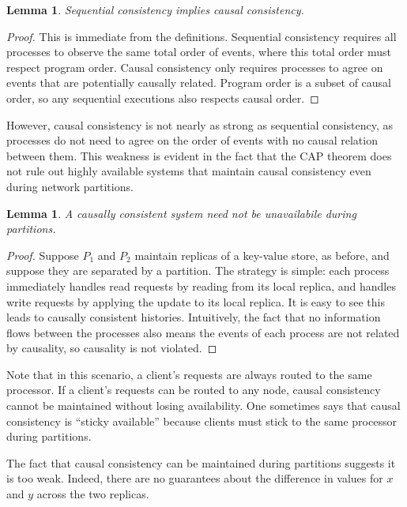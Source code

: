 \documentclass[]             %
{NASA}                       %
\newtheorem{lemma}[theorem]{Lemma}
\theoremstyle{definition}
\begin{document}
\begin{lemma}
    Sequential consistency implies causal consistency.
\end{lemma}
\begin{proof}
This is immediate from the definitions. Sequential consistency
requires all processes to observe the same total order of events,
where this total order must respect program order. Causal consistency
only requires processes to agree on events that are potentially
causally related. Program order is a subset of causal order, so any
sequential executions also respects causal order.
\end{proof}

However, causal consistency is not nearly as strong as sequential
consistency, as processes do not need to agree on the order of events
with no causal relation between them. This weakness is evident in the
fact that the CAP theorem does not rule out highly available systems
that maintain causal consistency even during network partitions.

\begin{lemma}
    A causally consistent system need not be unavailabile during partitions.
\end{lemma}
\begin{proof}

Suppose $P_1$ and $P_2$ maintain replicas of a key-value store, as
before, and suppose they are separated by a partition. The strategy is
simple: each process immediately handles read requests by reading from
its local replica, and handles write requests by applying the update
to its local replica. It is easy to see this leads to causally
consistent histories. Intuitively, the fact that no information flows
between the processes also means the events of each process are not
related by causality, so causality is not violated.  \end{proof}

Note that in this scenario, a client's requests are always routed to the
same processor. If a client's requests can be routed to any node, causal
consistency cannot be maintained without losing availability. One
sometimes says that causal consistency is ``sticky available'' because
clients must stick to the same processor during partitions.

The fact that causal consistency can be maintained during partitions
suggests it is too weak. Indeed, there are no guarantees about the
difference in values for \(x\) and \(y\) across the two replicas.
\end{document}
